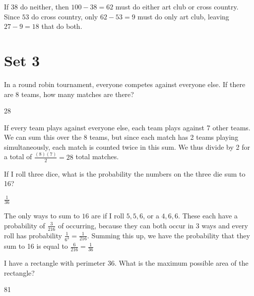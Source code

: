 \documentclass[11pt]{article}
\begin{document}
\begin{solution}
If 38 do neither, then $100-38=62$ must do either art club or cross country. Since $53$ do cross country, only $62-53=9$ must do only art club, leaving $27-9=\boxed{18}$ that do both.
\end{solution}

\newpage
\section*{Set 3}
\begin{problem}
In a round robin tournament, everyone competes against everyone else. If there are 8 teams, how many matches are there?
\end{problem}

\begin{answer}
28
\end{answer}

\begin{solution}
If every team plays against everyone else, each team plays against 7 other teams. We can sum this over the 8 teams, but since each match has 2 teams playing simultaneously, each match is counted twice in this sum.  We thus divide by 2 for a total of $\frac{(8)(7)}{2}=\boxed{28}$ total matches.
\end{solution}

\begin{problem}
If I roll three dice, what is the probability the numbers on the three die sum to 16?
\end{problem}

\begin{answer}
$\frac{1}{36}$
\end{answer}

\begin{solution}
The only ways to sum to $16$ are if I roll $5, 5, 6$, or a $4, 6, 6$. These each have a probability of $\frac{3}{216}$ of occurring, because they can both occur in 3 ways and every roll has probability $\frac{1}{6^3}=\frac{1}{216}$. Summing this up, we have the probability that they sum to 16 is equal to $\frac{6}{216} = \boxed{\frac{1}{36}}$
\end{solution}

\begin{problem}
I have a rectangle with perimeter 36. What is the maximum possible area of the rectangle?
\end{problem}

\begin{answer}
81
\end{answer}
\end{document}
